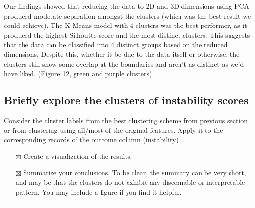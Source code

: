 \documentclass[
  letterpaper,
  DIV=11,
  numbers=noendperiod]{scrartcl}
\providecommand{\tightlist}{%
  \setlength{\itemsep}{0pt}\setlength{\parskip}{0pt}}\usepackage{longtable,booktabs,array}
\begin{document}
Our findings showed that reducing the data to 2D and 3D dimensions using
PCA produced moderate separation amongst the clusters (which was the
best result we could achieve). The K-Means model with 4 clusters was the
best performer, as it produced the highest Silhoutte score and the most
distinct clusters. This suggests that the data can be classified into 4
distinct groups based on the reduced dimensions. Despite this, whether
it be due to the data itself or otherwise, the clusters still show some
overlap at the boundaries and aren't as distinct as we'd have liked.
(Figure 12, green and purple clusters)

\subsection{Briefly explore the clusters of instability
scores}\label{briefly-explore-the-clusters-of-instability-scores}

Consider the cluster labels from the best clustering scheme from
previous section or from clustering using all/most of the original
features. Apply it to the corresponding records of the outcome column
(instability).

\begin{itemize}
\tightlist
\item[$\boxtimes$]
  Create a visualization of the results.
\item[$\boxtimes$]
  Summarize your conclusions. To be clear, the summary can be very
  short, and may be that the clusters do not exhibit any discernable or
  interpretable pattern. You may include a figure if you find it
  helpful.
\end{itemize}

\begin{center}\rule{0.5\linewidth}{0.5pt}\end{center}
\end{document}
